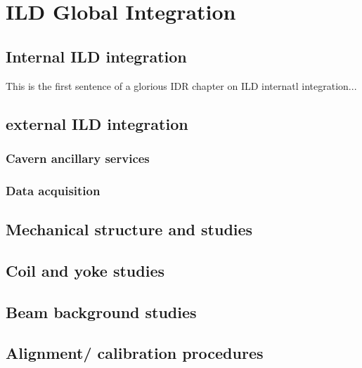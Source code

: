 \chapter{ILD Global Integration}

\section{Internal ILD integration}
This is the first sentence of a glorious IDR chapter on ILD internatl integration...

\section{external ILD integration}

\subsection{Cavern ancillary services}

\subsection{Data acquisition}

\section{Mechanical structure and studies}

\section{Coil and yoke studies}

\section{Beam background studies}

\section{Alignment/ calibration procedures}
